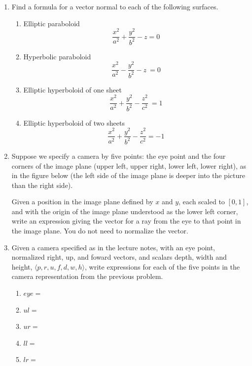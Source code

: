 \documentclass{article}
\begin{document}
\begin{enumerate}
\item Find a formula for a vector normal to each of the following surfaces.
  \begin{enumerate}
  \item Elliptic paraboloid \[\frac{x^2}{a^2} + \frac{y^2}{b^2} - z = 0\]
\vfill
  \item Hyperbolic paraboloid \[\frac{x^2}{a^2} - \frac{y^2}{b^2} - z\ = 0\]
\vfill
  \item Elliptic hyperboloid of one sheet \[\frac{x^2}{a^2} + \frac{y^2}{b^2} - \frac{z^2}{c^2}\ = 1\]
\vfill
  \item Elliptic hyperboloid of two sheets
    \[ \frac{x^2}{a^2} + \frac{y^2}{b^2} - \frac{z^2}{c^2} = -1\]
  \end{enumerate}
\vfill

  \newpage
  
\item Suppose we specify a camera by five points: the eye point and the four corners of
  the image plane (upper left, upper right, lower left, lower right),
  as in the figure below (the left side of the image plane is deeper
  into the picture than the right side). 

    \tikzset{>=latex}

Given a position in the image plane defined by $x$ and $y$, each
scaled to $[0,1]$, and with the origin of the image plane understood
as the lower left corner, write an expression giving the vector for a
ray from the eye to that point in the image plane.  You do not need to
normalize the vector.

\vfill

\item Given a camera specified as in the lecture notes, with an eye
  point, normalized right, up, and foward vectors, and scalars depth,
  width and height, $\langle p, r, u, f, d, w, h\rangle$, write
  expressions for each of the five points in the camera representation
  from the previous problem.
  \begin{enumerate}
  \item $eye =$
\vfill
    \item $ul = $
\vfill
    \item $ur = $
\vfill
    \item $ll = $
\vfill
    \item $lr = $
\vfill
  \end{enumerate}
  
\end{enumerate}
\end{document}
